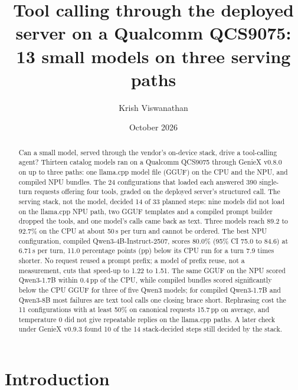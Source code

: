 \documentclass[11pt]{article}
\title{Tool calling through the deployed server on a Qualcomm QCS9075:\\
13 small models on three serving paths}
\author{Krish Viswanathan\authorcontact}
\date{October 2026}
\begin{document}
\maketitle

\begin{abstract}
Can a small model, served through the vendor's on-device stack, drive a tool-calling agent? Thirteen catalog models ran on a Qualcomm QCS9075 through GenieX v0.8.0 on up to three paths: one llama.cpp model file (GGUF) on the CPU and the NPU, and compiled NPU bundles. The 24 configurations that loaded each answered 390 single-turn requests offering four tools, graded on the deployed server's structured call. The serving stack, not the model, decided 14 of 33 planned steps: nine models did not load on the llama.cpp NPU path, two GGUF templates and a compiled prompt builder dropped the tools, and one model's calls came back as text. Three models reach 89.2 to 92.7\% on the CPU at about 50\,s per turn and cannot be ordered. The best NPU configuration, compiled Qwen3-4B-Instruct-2507, scores 80.0\% (95\% CI 75.0 to 84.6) at 6.71\,s per turn, 11.0 percentage points (pp) below its CPU run for a turn 7.9 times shorter. No request reused a prompt prefix; a model of prefix reuse, not a measurement, cuts that speed-up to 1.22 to 1.51. The same GGUF on the NPU scored Qwen3-1.7B within 0.4\,pp of the CPU, while compiled bundles scored significantly below the CPU GGUF for three of five Qwen3 models; for compiled Qwen3-1.7B and Qwen3-8B most failures are text tool calls one closing brace short. Rephrasing cost the 11 configurations with at least 50\% on canonical requests 15.7\,pp on average, and temperature 0 did not give repeatable replies on the llama.cpp paths. A later check under GenieX v0.9.3 found 10 of the 14 stack-decided steps still decided by the stack.
\end{abstract}

\section{Introduction}\label{sec:intro}
\end{document}
